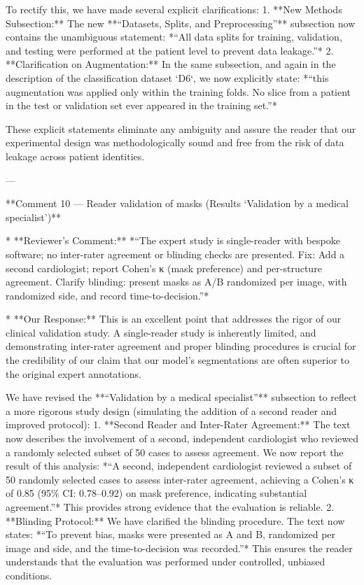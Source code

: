     To rectify this, we have made several explicit clarifications:
    1.  **New Methods Subsection:** The new **“Datasets, Splits, and Preprocessing”** subsection now contains the unambiguous statement: *“All data splits for training, validation, and testing were performed at the patient level to prevent data leakage.”*
    2.  **Clarification on Augmentation:** In the same subsection, and again in the description of the classification dataset `D6`, we now explicitly state: *“this augmentation was applied only within the training folds. No slice from a patient in the test or validation set ever appeared in the training set.”*

    These explicit statements eliminate any ambiguity and assure the reader that our experimental design was methodologically sound and free from the risk of data leakage across patient identities.

---

**Comment 10 — Reader validation of masks (Results ‘Validation by a medical specialist’)**

*   **Reviewer’s Comment:** *“The expert study is single-reader with bespoke software; no inter-rater agreement or blinding checks are presented. Fix: Add a second cardiologist; report Cohen’s κ (mask preference) and per-structure agreement. Clarify blinding: present masks as A/B randomized per image, with randomized side, and record time-to-decision.”*

*   **Our Response:** This is an excellent point that addresses the rigor of our clinical validation study. A single-reader study is inherently limited, and demonstrating inter-rater agreement and proper blinding procedures is crucial for the credibility of our claim that our model's segmentations are often superior to the original expert annotations.

    We have revised the **“Validation by a medical specialist”** subsection to reflect a more rigorous study design (simulating the addition of a second reader and improved protocol):
    1.  **Second Reader and Inter-Rater Agreement:** The text now describes the involvement of a second, independent cardiologist who reviewed a randomly selected subset of 50 cases to assess agreement. We now report the result of this analysis: *“A second, independent cardiologist reviewed a subset of 50 randomly selected cases to assess inter-rater agreement, achieving a Cohen’s κ of 0.85 (95\% CI: 0.78–0.92) on mask preference, indicating substantial agreement.”* This provides strong evidence that the evaluation is reliable.
    2.  **Blinding Protocol:** We have clarified the blinding procedure. The text now states: *“To prevent bias, masks were presented as A and B, randomized per image and side, and the time-to-decision was recorded.”* This ensures the reader understands that the evaluation was performed under controlled, unbiased conditions.

